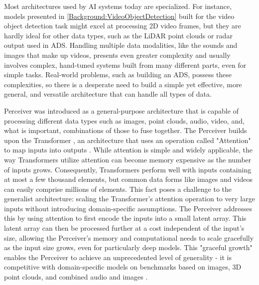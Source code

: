 Most architectures used by AI systems today are specialized. For instance, models presented in \ref{Background:VideoObjectDetection} built for the video object detection task might excel at processing 2D video frames, but they are hardly ideal for other data types, such as the LiDAR point clouds or radar output used in ADS. Handling multiple data modalities, like the sounds and images that make up videos, presents even greater complexity and usually involves complex, hand-tuned systems built from many different parts, even for simple tasks. Real-world problems, such as building an ADS, possess these complexities, so there is a desperate need to build a simple yet effective, more general, and versatile architecture that can handle all types of data.

Perceiver \cite{jaeglePerceiverGeneralPerception2021} was introduced as a general-purpose architecture that is capable of processing different data types such as images, point clouds, audio, video, and, what is important, combinations of those to fuse together. The Perceiver builds upon the Transformer \cite{vaswaniAttentionAllYou2023}, an architecture that uses an operation called "Attention" to map inputs into outputs \cite{bahdanauNeuralMachineTranslation2016a}. While attention is simple and widely applicable, the way Transformers utilize attention can become memory expensive as the number of inputs grows. Consequently, Transformers perform well with inputs containing at most a few thousand elements, but common data forms like images and videos can easily comprise millions of elements. This fact poses a challenge to the generalist architecture: scaling the Transformer's attention operation to very large inputs without introducing domain-specific assumptions. The Perceiver addresses this by using attention to first encode the inputs into a small latent array. This latent array can then be processed further at a cost independent of the input's size, allowing the Perceiver's memory and computational needs to scale gracefully as the input size grows, even for particularly deep models. This "graceful growth" enables the Perceiver to achieve an unprecedented level of generality - it is competitive with domain-specific models on benchmarks based on images, 3D point clouds, and combined audio and images \cite{jaeglePerceiverGeneralPerception2021}.


